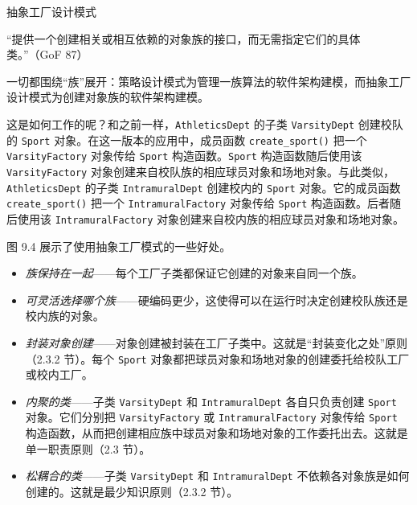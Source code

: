 \begin{mySidebar}{抽象工厂设计模式}

“提供一个创建相关或相互依赖的对象族的接口，而无需指定它们的具体类。”（GoF 87）
\end{mySidebar}

一切都围绕“族”展开：策略设计模式为管理一族算法的软件架构建模，而抽象工厂设计模式为创建对象族的软件架构建模。


这是如何工作的呢？和之前一样，\texttt{Athletics\allowbreak{}Dept} 的子类 \texttt{Varsity\allowbreak{}Dept} 创建校队的 \texttt{Sport} 对象。在这一版本的应用中，成员函数 \texttt{create\_\allowbreak{}sport(\allowbreak{})\allowbreak{}} 把一个 \texttt{Varsity\allowbreak{}Factory} 对象传给 \texttt{Sport} 构造函数。\texttt{Sport} 构造函数随后使用该 \texttt{Varsity\allowbreak{}Factory} 对象创建来自校队族的相应球员对象和场地对象。与此类似，\texttt{Athletics\allowbreak{}Dept} 的子类 \texttt{Intramural\allowbreak{}Dept} 创建校内的 \texttt{Sport} 对象。它的成员函数 \texttt{create\_\allowbreak{}sport(\allowbreak{})\allowbreak{}} 把一个 \texttt{Intramural\allowbreak{}Factory} 对象传给 \texttt{Sport} 构造函数。后者随后使用该 \texttt{Intramural\allowbreak{}Factory} 对象创建来自校内族的相应球员对象和场地对象。

图 9.4 展示了使用抽象工厂模式的一些好处。

\begin{itemize}
\item \emph{族保持在一起}——每个工厂子类都保证它创建的对象来自同一个族。
\item \emph{可灵活选择哪个族}——硬编码更少，这使得可以在运行时决定创建校队族还是校内族的对象。
\item \emph{封装对象创建}——对象创建被封装在工厂子类中。这就是“封装变化之处”原则（2.3.2 节）。每个 \texttt{Sport} 对象都把球员对象和场地对象的创建委托给校队工厂或校内工厂。
\item \emph{内聚的类}——子类 \texttt{Varsity\allowbreak{}Dept} 和 \texttt{Intramural\allowbreak{}Dept} 各自只负责创建 \texttt{Sport} 对象。它们分别把 \texttt{Varsity\allowbreak{}Factory} 或 \texttt{Intramural\allowbreak{}Factory} 对象传给 \texttt{Sport} 构造函数，从而把创建相应族中球员对象和场地对象的工作委托出去。这就是单一职责原则（2.3 节）。
\item \emph{松耦合的类}——子类 \texttt{Varsity\allowbreak{}Dept} 和 \texttt{Intramural\allowbreak{}Dept} 不依赖各对象族是如何创建的。这就是最少知识原则（2.3.2 节）。
\end{itemize}

